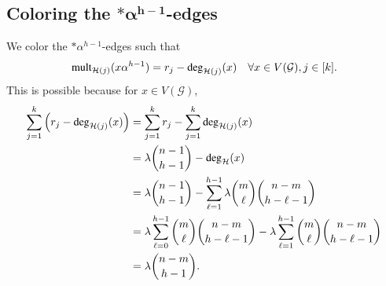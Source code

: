 \documentclass[12pt,oneside]{amsart}
\newcommand\mult{\operatorname{\textup{{\fontfamily{ptm}\selectfont mult}}}}
\newcommand\dg{\operatorname{\textup{{\fontfamily{ptm}\selectfont deg}}}}
\newcommand{\cc}{\mathcal}
\begin{document}
\subsection{Coloring the \texorpdfstring{$\bm{*\alpha^{h-1}}$}{p}-edges}  We  color  the $*\alpha^{h-1}$-edges  such that
$$
\mult_{\cc H(j)}(x\alpha^{h-1})=r_j - \dg_{\cc H(j)}(x) \quad \forall x\in V(\cc G), j\in [k].
$$
This is possible because for  $x\in V(\cc G)$,
\begin{align*}
    \sum_{j=1}^k\left(r_j-\dg_{\cc H(j)}(x)\right) &= \sum_{j=1}^k r_j - \sum_{j=1}^k\dg_{\cc H(j)}(x)\\
    &= \lambda\binom{n-1}{h-1} - \dg_\cc H(x)\\
    &= \lambda\binom{n-1}{h-1} - \sum_{\ell=1}^{h-1}\lambda\binom{m}{\ell}\binom{n-m}{h-\ell-1}\\
    &= \lambda\sum_{\ell=0}^{h-1}\binom{m}{\ell}\binom{n-m}{h-\ell-1} - \lambda\sum_{\ell=1}^{h-1}\binom{m}{\ell}\binom{n-m}{h-\ell-1}\\
    &= \lambda\binom{n-m}{h-1}.
\end{align*}
\end{document}
